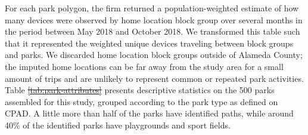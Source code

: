 \documentclass[3p, authoryear, review]{elsarticle} %
\providecommand{\DIFaddtex}[1]{{\protect\color{blue}\uwave{#1}}} %
\providecommand{\DIFdeltex}[1]{{\protect\color{red}\sout{#1}}}                      %
\providecommand{\DIFaddbegin}{} %
\providecommand{\DIFaddend}{} %
\providecommand{\DIFdelbegin}{} %
\providecommand{\DIFdelend}{} %
\providecommand{\DIFadd}[1]{\texorpdfstring{\DIFaddtex{#1}}{#1}} %
\providecommand{\DIFdel}[1]{\texorpdfstring{\DIFdeltex{#1}}{}} %
\newcommand{\DIFscaledelfig}{0.5}
\newlength{\DIFdelgraphicswidth} %
\newlength{\DIFdelgraphicsheight} %
\newcommand{\DIFaddincludegraphics}[2][]{{\color{blue}\fbox{\DIFOincludegraphics[#1]{#2}}}} %
\newcommand{\DIFdelincludegraphics}[2][]{%
\sbox{\DIFdelgraphicsbox}{\DIFOincludegraphics[#1]{#2}}%
\settoboxwidth{\DIFdelgraphicswidth}{\DIFdelgraphicsbox} %
\settoboxtotalheight{\DIFdelgraphicsheight}{\DIFdelgraphicsbox} %
\scalebox{\DIFscaledelfig}{%
\parbox[b]{\DIFdelgraphicswidth}{\usebox{\DIFdelgraphicsbox}\\[-\baselineskip] \rule{\DIFdelgraphicswidth}{0em}}\llap{\resizebox{\DIFdelgraphicswidth}{\DIFdelgraphicsheight}{%
\setlength{\unitlength}{\DIFdelgraphicswidth}%
\begin{picture}(1,1)%
\thicklines\linethickness{2pt} %
{\color[rgb]{1,0,0}\put(0,0){\framebox(1,1){}}}%
{\color[rgb]{1,0,0}\put(0,0){\line( 1,1){1}}}%
{\color[rgb]{1,0,0}\put(0,1){\line(1,-1){1}}}%
\end{picture}%
}\hspace*{3pt}}} %
} %
\DeclareRobustCommand{\DIFaddbegin}{\DIFOaddbegin \let\includegraphics\DIFaddincludegraphics} %
\DeclareRobustCommand{\DIFaddend}{\DIFOaddend \let\includegraphics\DIFOincludegraphics} %
\DeclareRobustCommand{\DIFdelbegin}{\DIFOdelbegin \let\includegraphics\DIFdelincludegraphics} %
\DeclareRobustCommand{\DIFdelend}{\DIFOaddend \let\includegraphics\DIFOincludegraphics} %
\begin{document}
For each park polygon, the firm returned a population-weighted estimate of how
many devices were observed by home location block group over several months in
the period between May 2018 and October 2018. We transformed this table such
that it represented the weighted unique devices traveling between block groups
and parks. We discarded home location block groups outside of Alameda County;
the imputed home locations can be far away from the study area for a small
amount of trips and are unlikely to represent common or repeated park
activities. Table \DIFdelbegin \DIFdel{\ref{tab:park-attributes} }\DIFdelend \DIFaddbegin \DIFadd{\ref{tab:parkstable} }\DIFaddend presents descriptive statistics on
the 500 parks assembled for this study, grouped according to the
park type as defined on CPAD. A little more than half of the parks have
identified paths, while around 40\% of the identified parks have playgrounds and
sport fields.
\end{document}
